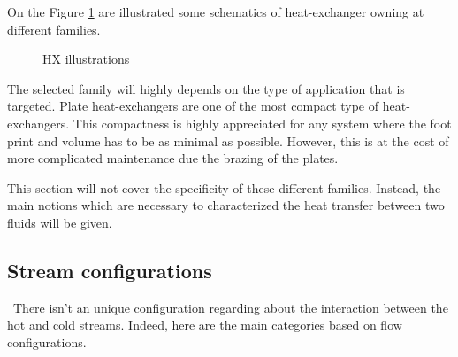 On the Figure \ref{fig:C3_HX} are illustrated some schematics of heat-exchanger owning at different families.
\begin{figure}[h]
\centering
{}\hfill
{}\hfill
{}
\caption{HX illustrations} \label{fig:C3_HX}
\end{figure}

The selected family will highly depends on the type of application that is targeted. Plate heat-exchangers are one of the most compact type of heat-exchangers. This compactness is highly appreciated for any system where the foot print and volume has to be as minimal as possible. However, this is at the cost of more complicated maintenance due the brazing of the plates.

This section will not cover the specificity of these different families. Instead, the main notions which are necessary to characterized the heat transfer between two fluids will be given.

\subsection{Stream configurations}
\quad\, There isn't an unique configuration regarding about the interaction between the hot and cold streams. Indeed, here are the main categories based on flow configurations.

